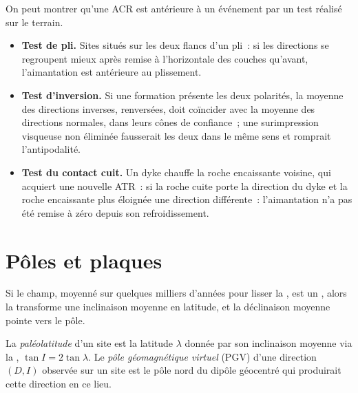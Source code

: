 \begin{method}\label{met:b3:palaeomagnetism:tests}
On peut montrer qu'une ACR est antérieure à un événement par un test réalisé sur le terrain.
\begin{itemize}
  \item \textbf{Test de pli.} Sites situés sur les deux flancs d'un pli~: si les directions
        se regroupent mieux après remise à l'horizontale des couches qu'avant,
        l'aimantation est antérieure au plissement.
  \item \textbf{Test d'inversion.} Si une formation présente les deux polarités, la moyenne
        des directions inverses, renversées, doit coïncider avec la moyenne des
        directions normales, dans leurs cônes de confiance~; une surimpression visqueuse
        non éliminée fausserait les deux dans le même sens et romprait l'antipodalité.
  \item \textbf{Test du contact cuit.} Un dyke chauffe la roche encaissante voisine,
        qui acquiert une nouvelle ATR~: si la roche cuite porte la direction du dyke
        et la roche encaissante plus éloignée une direction différente~: l'aimantation
        n'a pas été remise à zéro depuis son refroidissement.
\end{itemize}
\end{method}

\section{Pôles et plaques}

Si le champ, moyenné sur quelques milliers d'années pour lisser la , est un , alors la  transforme
une inclinaison moyenne en latitude, et la déclinaison moyenne pointe vers le pôle.

\begin{definition}\label{def:b3:palaeomagnetism:vgp}
La \emph{paléolatitude} d'un site est la latitude
$\lambda$ donnée par son inclinaison moyenne via la , $\tan I =
2\tan\lambda$. Le \emph{pôle géomagnétique virtuel}
(PGV) d'une direction $(D, I)$ observée sur un site est le pôle nord du
dipôle géocentré qui produirait cette direction en ce lieu.
\end{definition}

